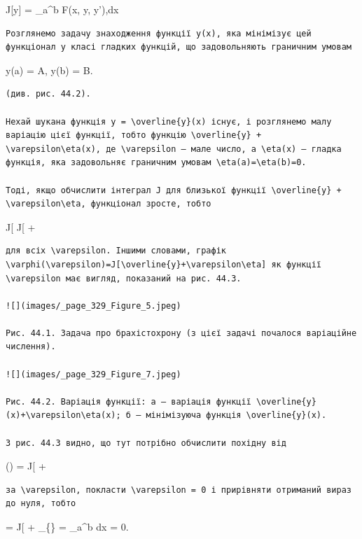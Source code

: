 \documentclass[
  ukrainian,
]{article}
\begin{document}
J{[}y{]} = \int\_a\^{}b F(x, y, y'),dx

\begin{verbatim}
Розглянемо задачу знаходження функції y(x), яка мінімізує цей функціонал у класі гладких функцій, що задовольняють граничним умовам
\end{verbatim}

y(a) = A, \qquad y(b) = B.

\begin{verbatim}
(див. рис. 44.2).

Нехай шукана функція y = \overline{y}(x) існує, і розглянемо малу варіацію цієї функції, тобто функцію \overline{y} + \varepsilon\eta(x), де \varepsilon — мале число, а \eta(x) — гладка функція, яка задовольняє граничним умовам \eta(a)=\eta(b)=0.

Тоді, якщо обчислити інтеграл J для близької функції \overline{y} + \varepsilon\eta, функціонал зросте, тобто
\end{verbatim}

J{[}\overline{y}{]} \leqslant J{[} + \varepsilon\eta{]}

\begin{verbatim}
для всіх \varepsilon. Іншими словами, графік \varphi(\varepsilon)=J[\overline{y}+\varepsilon\eta] як функції \varepsilon має вигляд, показаний на рис. 44.3.

![](images/_page_329_Figure_5.jpeg)

Рис. 44.1. Задача про брахістохрону (з цієї задачі почалося варіаційне числення).

![](images/_page_329_Figure_7.jpeg)

Рис. 44.2. Варіація функції: a — варіація функції \overline{y}(x)+\varepsilon\eta(x); б — мінімізуюча функція \overline{y}(x).

З рис. 44.3 видно, що тут потрібно обчислити похідну від
\end{verbatim}

\varphi(\varepsilon) = J{[} + \varepsilon\eta{]}

\begin{verbatim}
за \varepsilon, покласти \varepsilon = 0 і прирівняти отриманий вираз до нуля, тобто
\end{verbatim}


=  J{[} +
\varepsilon\eta{]}\bigg\textbar\_\{\} = \int\_a\^{}b  dx = 0.
\end{document}
